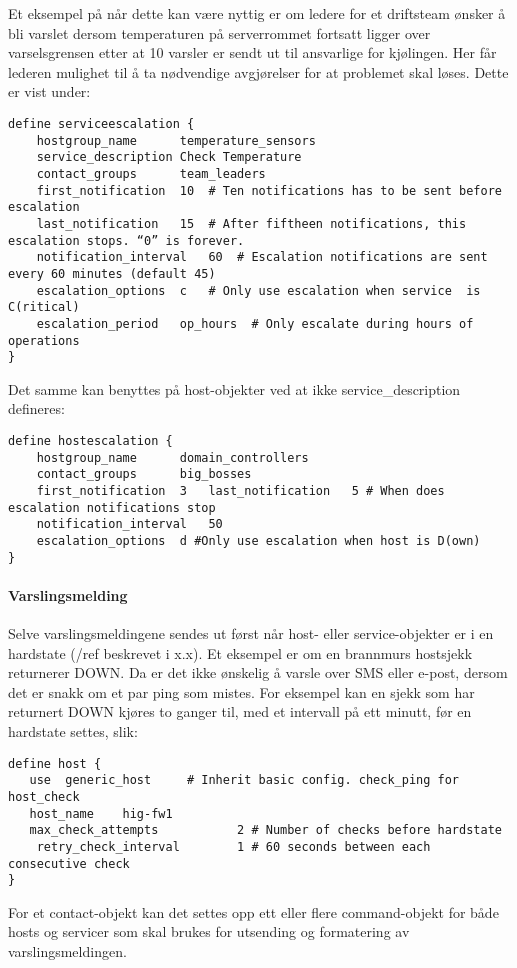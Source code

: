 Et eksempel på når dette kan være nyttig er om ledere for et driftsteam ønsker å bli varslet dersom temperaturen på serverrommet fortsatt ligger over varselsgrensen etter at 10 varsler er sendt ut til ansvarlige for kjølingen. Her får lederen mulighet til å ta nødvendige avgjørelser for at problemet skal løses. Dette er vist under:
\begin{lstlisting}
define serviceescalation {
	hostgroup_name		temperature_sensors
	service_description	Check Temperature
	contact_groups		team_leaders
	first_notification	10	# Ten notifications has to be sent before escalation
	last_notification	15	# After fiftheen notifications, this escalation stops. “0” is forever.
	notification_interval	60 	# Escalation notifications are sent every 60 minutes (default 45)
	escalation_options	c	# Only use escalation when service  is C(ritical)
	escalation_period	op_hours  # Only escalate during hours of operations
}
\end{lstlisting}
Det samme kan benyttes på host-objekter ved at ikke service\_description defineres:
\begin{lstlisting}
define hostescalation {
	hostgroup_name		domain_controllers
	contact_groups		big_bosses
	first_notification	3 	last_notification	5 # When does escalation notifications stop
	notification_interval	50
	escalation_options	d #Only use escalation when host is D(own)
}
\end{lstlisting}

\paragraph{Varslingsmelding}

Selve varslingsmeldingene sendes ut først når host- eller service-objekter er i en hardstate (/ref beskrevet i x.x). Et eksempel er om en brannmurs hostsjekk returnerer DOWN. Da er det ikke ønskelig å varsle over SMS eller e-post, dersom det er snakk om et par ping som mistes. For eksempel kan en sjekk som har returnert DOWN kjøres to ganger til, med et intervall på ett minutt, før en hardstate settes, slik:

\begin{lstlisting}
define host {
   use 	generic_host     # Inherit basic config. check_ping for host_check
   host_name	hig-fw1
   max_check_attempts           2 # Number of checks before hardstate
    retry_check_interval        1 # 60 seconds between each consecutive check
}
\end{lstlisting}

For et contact-objekt kan det settes opp ett eller flere command-objekt for både hosts og servicer som skal brukes for utsending og formatering av varslingsmeldingen.  

